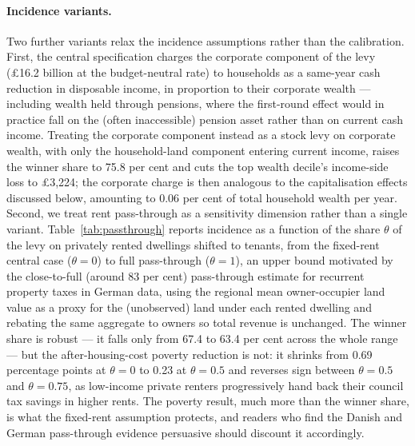 \paragraph{Incidence variants.} Two further variants relax the incidence assumptions rather than the calibration. First, the central specification charges the corporate component of the levy (\pounds 16.2 billion at the budget-neutral rate) to households as a same-year cash reduction in disposable income, in proportion to their corporate wealth --- including wealth held through pensions, where the first-round effect would in practice fall on the (often inaccessible) pension asset rather than on current cash income. Treating the corporate component instead as a stock levy on corporate wealth, with only the household-land component entering current income, raises the winner share to 75.8 per cent and cuts the top wealth decile's income-side loss to \pounds 3{,}224; the corporate charge is then analogous to the capitalisation effects discussed below, amounting to 0.06 per cent of total household wealth per year. Second, we treat rent pass-through as a sensitivity dimension rather than a single variant. Table~\ref{tab:passthrough} reports incidence as a function of the share $\theta$ of the levy on privately rented dwellings shifted to tenants, from the fixed-rent central case ($\theta=0$) to full pass-through ($\theta=1$), an upper bound motivated by the close-to-full (around 83 per cent) pass-through \citet{loeffler2024} estimate for recurrent property taxes in German data, using the regional mean owner-occupier land value as a proxy for the (unobserved) land under each rented dwelling and rebating the same aggregate to owners so total revenue is unchanged. The winner share is robust --- it falls only from 67.4 to 63.4 per cent across the whole range --- but the after-housing-cost poverty reduction is not: it shrinks from 0.69 percentage points at $\theta=0$ to 0.23 at $\theta=0.5$ and reverses sign between $\theta=0.5$ and $\theta=0.75$, as low-income private renters progressively hand back their council tax savings in higher rents. The poverty result, much more than the winner share, is what the fixed-rent assumption protects, and readers who find the Danish and German pass-through evidence persuasive should discount it accordingly.

